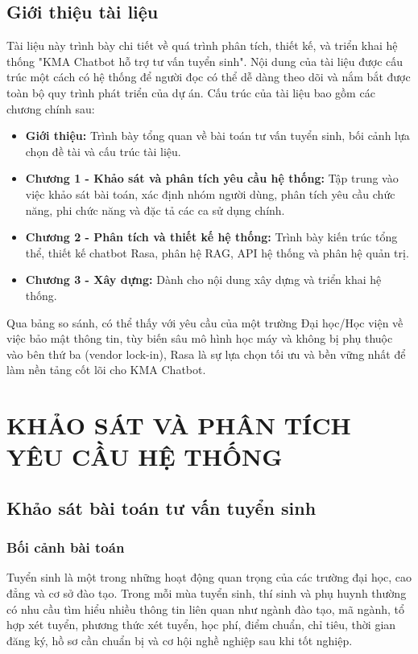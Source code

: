 \documentclass[12pt,a4paper]{report}
\begin{document}
\section{Giới thiệu tài liệu}
\label{sec:document_introduction}
Tài liệu này trình bày chi tiết về quá trình phân tích, thiết kế, và triển khai hệ thống "KMA Chatbot hỗ trợ tư vấn tuyển sinh". Nội dung của tài liệu được cấu trúc một cách có hệ thống để người đọc có thể dễ dàng theo dõi và nắm bắt được toàn bộ quy trình phát triển của dự án. Cấu trúc của tài liệu bao gồm các chương chính sau:
\begin{itemize}
    \item \textbf{Giới thiệu:} Trình bày tổng quan về bài toán tư vấn tuyển sinh, bối cảnh lựa chọn đề tài và cấu trúc tài liệu.
    \item \textbf{Chương 1 - Khảo sát và phân tích yêu cầu hệ thống:} Tập trung vào việc khảo sát bài toán, xác định nhóm người dùng, phân tích yêu cầu chức năng, phi chức năng và đặc tả các ca sử dụng chính.
    \item \textbf{Chương 2 - Phân tích và thiết kế hệ thống:} Trình bày kiến trúc tổng thể, thiết kế chatbot Rasa, phân hệ RAG, API hệ thống và phân hệ quản trị.
    \item \textbf{Chương 3 - Xây dựng:} Dành cho nội dung xây dựng và triển khai hệ thống.
\end{itemize}


Qua bảng so sánh, có thể thấy với yêu cầu của một trường Đại học/Học viện về việc bảo mật thông tin, tùy biến sâu mô hình học máy và không bị phụ thuộc vào bên thứ ba (vendor lock-in), Rasa là sự lựa chọn tối ưu và bền vững nhất để làm nền tảng cốt lõi cho KMA Chatbot.

\endgroup

\chapter{KHẢO SÁT VÀ PHÂN TÍCH YÊU CẦU HỆ THỐNG}

\section{Khảo sát bài toán tư vấn tuyển sinh}
\subsection{Bối cảnh bài toán}

Tuyển sinh là một trong những hoạt động quan trọng của các trường đại học, cao đẳng và cơ sở đào tạo. Trong mỗi mùa tuyển sinh, thí sinh và phụ huynh thường có nhu cầu tìm hiểu nhiều thông tin liên quan như ngành đào tạo, mã ngành, tổ hợp xét tuyển, phương thức xét tuyển, học phí, điểm chuẩn, chỉ tiêu, thời gian đăng ký, hồ sơ cần chuẩn bị và cơ hội nghề nghiệp sau khi tốt nghiệp.
\end{document}
